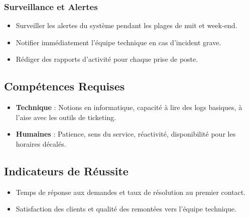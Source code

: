 \documentclass[12pt,a4paper]{article}
\begin{document}
\subsubsection{Surveillance et Alertes}
\begin{itemize}[label=\textbullet]
    \item Surveiller les alertes du système pendant les plages de nuit et week-end.
    \item Notifier immédiatement l'équipe technique en cas d'incident grave.
    \item Rédiger des rapports d'activité pour chaque prise de poste.
\end{itemize}

\subsection{Compétences Requises}
\begin{itemize}[label=\textbullet]
    \item \textbf{Technique} : Notions en informatique, capacité à lire des logs basiques, à l'aise avec les outils de ticketing.
    \item \textbf{Humaines} : Patience, sens du service, réactivité, disponibilité pour les horaires décalés.
\end{itemize}

\subsection{Indicateurs de Réussite}
\begin{itemize}[label=\textbullet]
    \item Temps de réponse aux demandes et taux de résolution au premier contact.
    \item Satisfaction des clients et qualité des remontées vers l'équipe technique.
\end{itemize}
\end{document}

